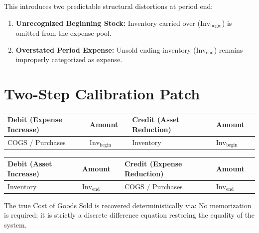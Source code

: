 

This introduces two predictable structural distortions at period end:
\begin{enumerate}
    \item \textbf{Unrecognized Beginning Stock:} Inventory carried over ($\text{Inv}_{\text{begin}}$) is omitted from the expense pool.
    \item \textbf{Overstated Period Expense:} Unsold ending inventory ($\text{Inv}_{\text{end}}$) remains improperly categorized as expense.
\end{enumerate}

\section{Two-Step Calibration Patch}
\begin{table}[htbp]
\centering
\begin{tabular}{llrllr}
\toprule
\textbf{Debit (Expense Increase)} & Amount & \quad & \textbf{Credit (Asset Reduction)} & Amount \\
\midrule
COGS / Purchases & $\text{Inv}_{\text{begin}}$ & & Inventory & $\text{Inv}_{\text{begin}}$ \\
\bottomrule
\end{tabular}
\end{table}

\begin{table}[htbp]
\centering
\begin{tabular}{llrllr}
\toprule
\textbf{Debit (Asset Increase)} & Amount & \quad & \textbf{Credit (Expense Reduction)} & Amount \\
\midrule
Inventory & $\text{Inv}_{\text{end}}$ & & COGS / Purchases & $\text{Inv}_{\text{end}}$ \\
\bottomrule
\end{tabular}
\end{table}

The true Cost of Goods Sold is recovered deterministically via:
No memorization is required; it is strictly a discrete difference equation restoring the equality of the system.
\fi
